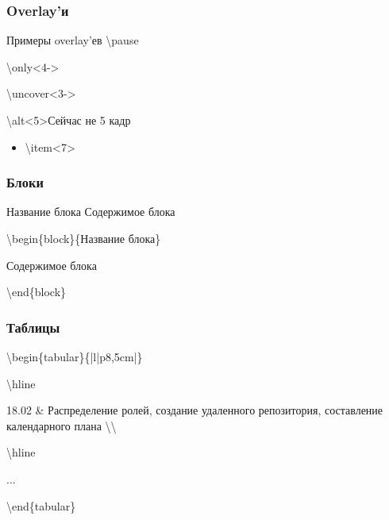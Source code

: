\documentclass[russian, 14pt]{beamer}
\begin{document}
\begin{frame}
	\frametitle{Overlay'и}
		\begin{block}{Примеры overlay'ев}
			\pause \textbackslash pause
			
			
			 {\textbackslash only<4->} 
			
			
			 {\textbackslash uncover<3->}
			
			
			 {\textbackslash alt<5>}{Сейчас не 5 кадр}
			
			
			
			
			\begin{itemize}
				\item<7> {\textbackslash item<7>} 
			\end{itemize}
		\end{block}
\end{frame}

\begin{frame}
	\frametitle{Блоки}
	\begin{block}{Название блока}
		Содержимое блока
	\end{block}


	\textbackslash begin\{block\}\{Название блока\}
	
	
	Содержимое блока
	
	
	\textbackslash end\{block\}
\end{frame}

\begin{frame}
	\frametitle{Таблицы}
	\begin{flushleft}
	\textbackslash begin\{tabular\}\{|l|p{8,5cm}|\}
	
	
		\textbackslash hline
		
		
		18.02 \& Распределение ролей, создание удаленного репозитория, составление календарного плана \textbackslash\textbackslash
		
		
		\textbackslash hline


		...
		
		
		\textbackslash end\{tabular\}
		
		
		\hyperlink{tab}{}
	\end{flushleft}
\end{frame}
\end{document}
